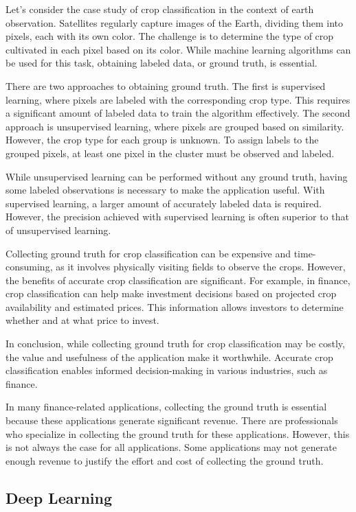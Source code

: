 Let's consider the case study of crop classification in the context of
earth observation. Satellites regularly capture images of the Earth,
dividing them into pixels, each with its own color. The challenge is to
determine the type of crop cultivated in each pixel based on its color.
While machine learning algorithms can be used for this task, obtaining
labeled data, or ground truth, is essential.

There are two approaches to obtaining ground truth. The first is
supervised learning, where pixels are labeled with the corresponding
crop type. This requires a significant amount of labeled data to train
the algorithm effectively. The second approach is unsupervised learning,
where pixels are grouped based on similarity. However, the crop type for
each group is unknown. To assign labels to the grouped pixels, at least
one pixel in the cluster must be observed and labeled.

While unsupervised learning can be performed without any ground truth,
having some labeled observations is necessary to make the application
useful. With supervised learning, a larger amount of accurately labeled
data is required. However, the precision achieved with supervised
learning is often superior to that of unsupervised learning.

Collecting ground truth for crop classification can be expensive and
time-consuming, as it involves physically visiting fields to observe the
crops. However, the benefits of accurate crop classification are
significant. For example, in finance, crop classification can help make
investment decisions based on projected crop availability and estimated
prices. This information allows investors to determine whether and at
what price to invest.

In conclusion, while collecting ground truth for crop classification may
be costly, the value and usefulness of the application make it
worthwhile. Accurate crop classification enables informed
decision-making in various industries, such as finance.

In many finance-related applications, collecting the ground truth is
essential because these applications generate significant revenue. There
are professionals who specialize in collecting the ground truth for
these applications. However, this is not always the case for all
applications. Some applications may not generate enough revenue to
justify the effort and cost of collecting the ground truth.

\subsection{Deep Learning}\label{deep-learning}

